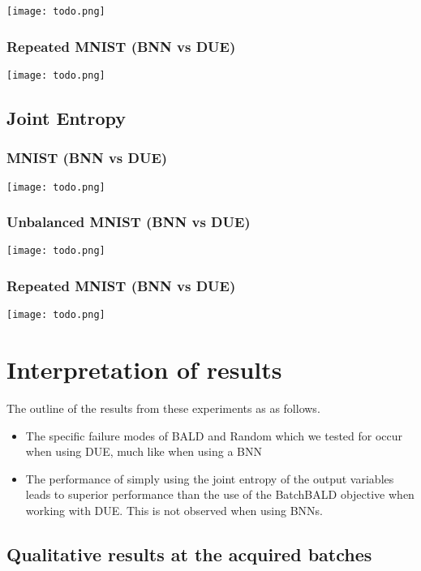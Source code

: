 \documentclass[12pt, a4paper]{report}
\theoremstyle{definition}
\theoremstyle{definition}
\theoremstyle{definition}
\begin{document}
\texttt{[image: todo.png]}

\subsubsection{Repeated MNIST (BNN vs DUE)}

\texttt{[image: todo.png]}


\subsection{Joint Entropy}

\subsubsection{MNIST (BNN vs DUE)}

\texttt{[image: todo.png]}

\subsubsection{Unbalanced MNIST (BNN vs DUE)}

\texttt{[image: todo.png]}

\subsubsection{Repeated MNIST (BNN vs DUE)}

\texttt{[image: todo.png]}




\section{Interpretation of results}

The outline of the results from these experiments as as follows.

\begin{itemize}
    \item The specific failure modes of BALD and Random which we tested for occur when using DUE, much like when using a BNN
    \item The performance of simply using the joint entropy of the output variables leads to superior performance than the use of the BatchBALD objective when working with DUE. This is not observed when using BNNs.
\end{itemize}


\subsection{Qualitative results at the acquired batches}
\end{document}
